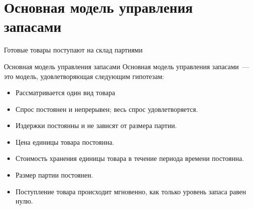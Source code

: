 \documentclass[unicode,11pt,notheorems,xcolor=table]{beamer}
\begin{document}

\section{Основная модель управления запасами}
\begin{frame}{}
    \begin{block}{}
        \centering \LARGE {}
        \par
    \end{block}
    
    Готовые товары поступают на склад партиями
\end{frame}


\begin{frame}{Основная модель управления запасами}
    \alert{Основная модель управления запасами}~--- это 
    модель, удовлетворяющая следующим гипотезам:
    \begin{itemize}
        \item Рассматривается один вид товара
        \item Спрос постоянен и непрерывен; весь спрос удовлетворяется.
        \item Издержки постоянны и не зависят от размера партии.
        \item Цена единицы товара постоянна. 
        \item Стоимость хранения единицы товара в течение периода времени постоянна.
        \item Размер партии постоянен. 
        \item \alert{Поступление товара происходит мгновенно, как только уровень запаса равен нулю.}
\end{itemize}
\end{frame}
\end{document}
